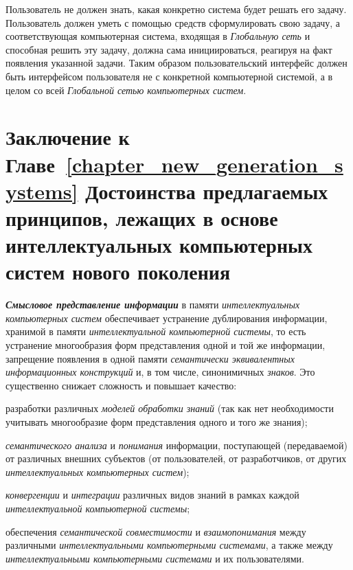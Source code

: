 Пользователь не должен знать, какая конкретно система будет решать его задачу. Пользователь должен уметь с помощью  средств сформулировать свою задачу, а соответствующая компьютерная система, входящая в \textit{Глобальную сеть} и способная решить эту задачу, должна сама инициироваться, реагируя на факт появления указанной задачи. Таким образом пользовательский интерфейс должен быть интерфейсом пользователя не с конкретной компьютерной системой, а в целом со всей \textit{Глобальной сетью компьютерных систем}.

\section*{Заключение к Главе~\ref{chapter_new_generation_systems} Достоинства предлагаемых принципов, лежащих в основе интеллектуальных компьютерных систем нового поколения}
\label{sec_ngics_advant}

\textbf{\textit{Смысловое представление информации}} в памяти \textit{интеллектуальных компьютерных систем} обеспечивает устранение дублирования информации, хранимой в памяти \textit{интеллектуальной компьютерной системы}, то есть устранение многообразия форм представления одной и той же информации, запрещение появления в одной памяти \textit{семантически эквивалентных информационных конструкций} и, в том числе, синонимичных \textit{знаков}. Это существенно снижает сложность и повышает качество:

\begin{textitemize}
	\item разработки различных \textit{моделей обработки знаний} (так как нет необходимости учитывать многообразие форм представления одного и того же знания);
	\item \textit{семантического анализа} и \textit{понимания} информации, поступающей (передаваемой) от различных внешних субъектов (от пользователей, от разработчиков, от других \textit{интеллектуальных компьютерных систем});
	\item \textit{конвергенции} и \textit{интеграции} различных видов знаний в рамках каждой \textit{интеллектуальной компьютерной системы};
	\item обеспечения \textit{семантической совместимости} и \textit{взаимопонимания} между различными \textit{интеллектуальными компьютерными системами}, а также между \textit{интеллектуальными компьютерными системами} и их пользователями.
\end{textitemize}

